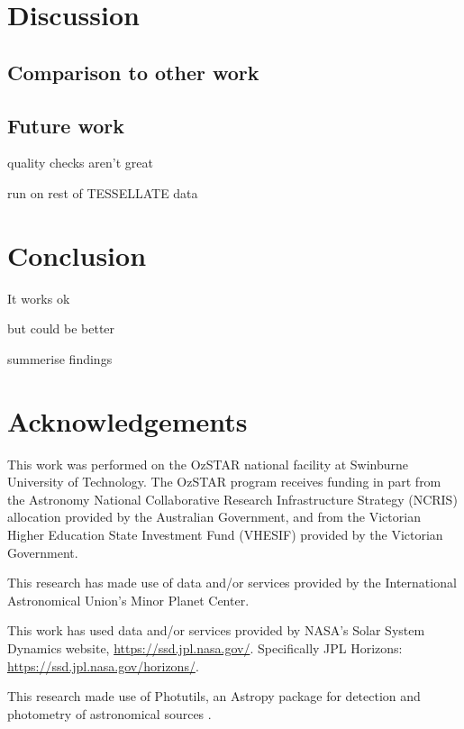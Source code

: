\documentclass{UCreport}
\begin{document}
\section{Discussion}\label{Sec:Disc}

\subsection{Comparison to other work }%



\subsection{Future work}

quality checks aren't great

run on rest of TESSELLATE data

\section{Conclusion}\label{Sec:Conc}

It works ok

but could be better

summerise findings

\newpage %

\section*{Acknowledgements}
\small
This work was performed on the OzSTAR national facility at Swinburne University of Technology.
The OzSTAR program receives funding in part from the Astronomy National Collaborative Research Infrastructure Strategy (NCRIS) allocation provided by the Australian Government, and from the Victorian Higher Education State Investment Fund (VHESIF) provided by the Victorian Government.

This research has made use of data and/or services provided by the International Astronomical Union's Minor Planet Center.

This work has used data and/or services provided by NASA's Solar System Dynamics website, \url{https://ssd.jpl.nasa.gov/}. Specifically JPL Horizons: \url{https://ssd.jpl.nasa.gov/horizons/}.

This research made use of Photutils, an Astropy package for detection and photometry of astronomical sources \citep{Bradley2024}.

% 

\end{document}
